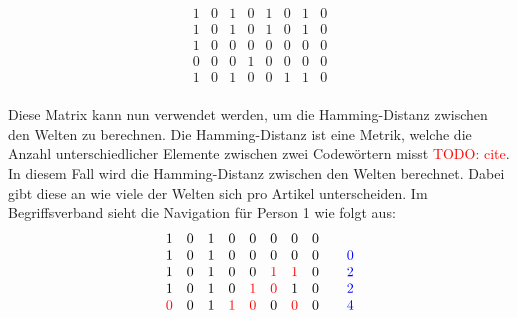 \setcounter{equation}{0}
\begin{equation}
    \begin{matrix}
        1 & 0 & 1 & 0 & 1 & 0 & 1 & 0 \\
        1 & 0 & 1 & 0 & 1 & 0 & 1 & 0 \\
        1 & 0 & 0 & 0 & 0 & 0 & 0 & 0 \\
        0 & 0 & 0 & 1 & 0 & 0 & 0 & 0 \\
        1 & 0 & 1 & 0 & 0 & 1 & 1 & 0 \\
    \end{matrix}
\end{equation}

Diese Matrix kann nun verwendet werden, um die Hamming-Distanz zwischen den Welten zu berechnen.
Die Hamming-Distanz ist eine Metrik, welche die Anzahl unterschiedlicher Elemente zwischen zwei Codewörtern misst \textcolor{red}{TODO: cite}.
In diesem Fall wird die Hamming-Distanz zwischen den Welten berechnet.
Dabei gibt diese an wie viele der Welten sich pro Artikel unterscheiden.
Im Begriffsverband sieht die Navigation für Person 1 wie folgt aus:
\begin{equation}
    \begin{array}{ccccccccc}
        1                  & 0 & 1 & 0                  & 0                  & 0                  & 0                  & 0 &                                              \\
        1                  & 0 & 1 & 0                  & 0                  & 0                  & 0                  & 0 & \multicolumn{1}{r}{\quad\textcolor{blue}{0}} \\
        1                  & 0 & 1 & 0                  & 0                  & \textcolor{red}{1} & \textcolor{red}{1} & 0 & \multicolumn{1}{r}{\quad\textcolor{blue}{2}} \\
        1                  & 0 & 1 & 0                  & \textcolor{red}{1} & \textcolor{red}{0} & 1                  & 0 & \multicolumn{1}{r}{\quad\textcolor{blue}{2}} \\
        \textcolor{red}{0} & 0 & 1 & \textcolor{red}{1} & \textcolor{red}{0} & 0                  & \textcolor{red}{0} & 0 & \multicolumn{1}{r}{\quad\textcolor{blue}{4}} \\
    \end{array}
    \label{eq:hamming-distance}
\end{equation}

